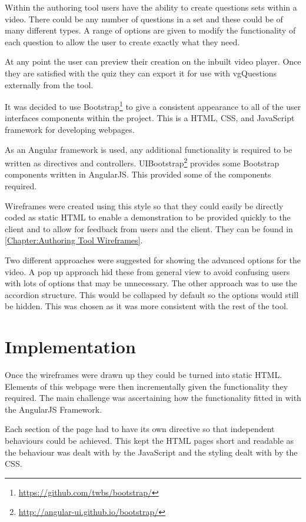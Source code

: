 Within the authoring tool users have the ability to create questions sets within a video. There could be any number of questions in a set and these could be of many different types. A range of options are given to modify the functionality of each question to allow the user to create exactly what they need.

At any point the user can preview their creation on the inbuilt video player. Once they are satisfied with the quiz they can export it for use with \gls{vgQuestions} externally from the tool.

It was decided to use Bootstrap\footnote{\url{https://github.com/twbs/bootstrap/}} to give a consistent appearance to all of the user interfaces components within the project. This is a HTML, \gls{CSS}, and JavaScript framework for developing webpages.

As an Angular framework is used, any additional functionality is required to be written as directives and controllers. UIBootstrap\footnote{\url{http://angular-ui.github.io/bootstrap/}} provides some Bootstrap components written in \gls{AngularJS}. This provided some of the components required. 

Wireframes were created using this style so that they could easily be directly coded as static HTML to enable a demonstration to be provided quickly to the client and to allow for feedback from users and the client. They can be found in \autoref{Chapter:Authoring Tool Wireframes}.

Two different approaches were suggested for showing the advanced options for the video. A pop up approach hid these from general view to avoid confusing users with lots of options that may be unnecessary. The other approach was to use the accordion structure. This would be collapsed by default so the options would still be hidden. This was chosen as it was more consistent with the rest of the tool. 

\section{Implementation}
\label{Section:Authoring_Implementation}
Once the wireframes were drawn up they could be turned into static HTML. Elements of this webpage were then incrementally given the functionality they required. The main challenge was ascertaining how the functionality fitted in with the \gls{AngularJS} Framework. 

Each section of the page had to have its own directive so that independent behaviours could be achieved. This kept the HTML pages short and readable as the behaviour was dealt with by the JavaScript and the styling dealt with by the \gls{CSS}.

